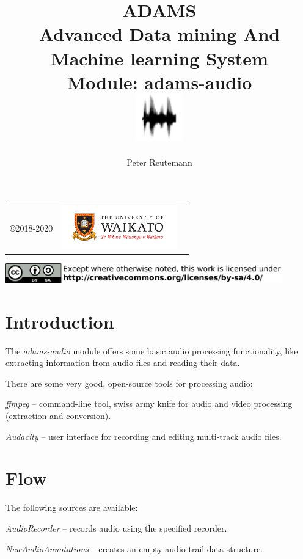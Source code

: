 \documentclass[a4paper]{book}
\title{
  \textbf{ADAMS} \\
  {\Large \textbf{A}dvanced \textbf{D}ata mining \textbf{A}nd \textbf{M}achine
  learning \textbf{S}ystem} \\
  {\Large Module: adams-audio} \\
  \vspace{1cm}
  \includegraphics[width=2cm]{images/audio-module.png} \\
}
\author{
  Peter Reutemann
}
\begin{document}
\begin{titlepage}
\maketitle

\thispagestyle{empty}
\center
\begin{table}[b]
	\begin{tabular}{c l l}
		\parbox[c][2cm]{2cm}{\copyright 2018-2020} &
		\parbox[c][2cm]{5cm}{\includegraphics[width=5cm]{images/coat_of_arms.pdf}} \\
	\end{tabular}
	\includegraphics[width=12cm]{images/cc.png} \\
\end{table}

\end{titlepage}

\tableofcontents

\chapter{Introduction}
The \textit{adams-audio} module offers some basic audio processing functionality,
like extracting information from audio files and reading their data.

There are some very good, open-source tools for processing audio:
\begin{tight_itemize}
  \item \textit{ffmpeg}\cite{ffmpeg} -- command-line tool, swiss army knife
  for audio and video processing (extraction and conversion).
  \item \textit{Audacity}\cite{audacity} -- user interface for recording and
  editing multi-track audio files.
\end{tight_itemize}


\chapter{Flow}
The following sources are available:
\begin{tight_itemize}
  \item \textit{AudioRecorder} -- records audio using the specified recorder.
  \item \textit{NewAudioAnnotations} -- creates an empty audio trail data structure.
\end{tight_itemize}
\end{document}

